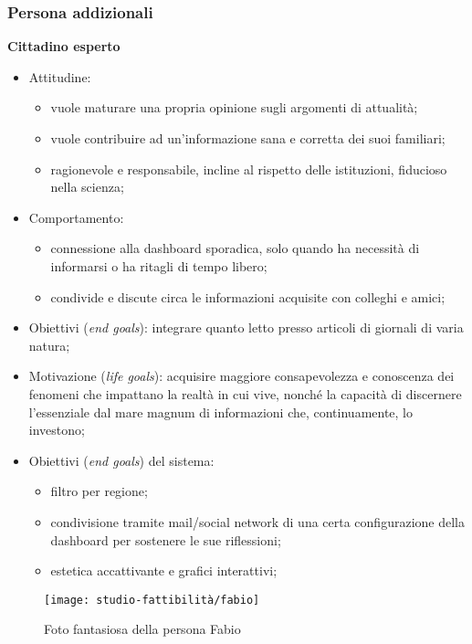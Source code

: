 \subsubsection*{Persona addizionali}
\textbf{Cittadino esperto}
	\begin{itemize}
	\item Attitudine:
    \begin{itemize}
        \item vuole maturare una propria opinione sugli argomenti di attualità;
        \item vuole contribuire ad un'informazione sana e corretta dei suoi familiari;
        \item ragionevole e responsabile, incline al rispetto delle istituzioni, fiducioso nella scienza;
    \end{itemize}
	\item Comportamento: 
    \begin{itemize}
        \item connessione alla dashboard sporadica, solo quando ha necessità di informarsi o ha ritagli di tempo libero;
        \item condivide e discute circa le informazioni acquisite con colleghi e amici;
    \end{itemize}
    \item Obiettivi (\textit{end goals}): integrare quanto letto presso articoli di giornali di varia natura;
    \item Motivazione (\textit{life goals}): acquisire maggiore consapevolezza e conoscenza dei fenomeni che impattano la realtà in cui vive, nonché la capacità di discernere l'essenziale dal mare magnum di informazioni che, continuamente, lo investono;
    \item Obiettivi (\textit{end goals}) del sistema:
    \begin{itemize}
        \item filtro per regione;
        \item condivisione tramite mail/social network di una certa configurazione della dashboard per sostenere le sue riflessioni;
        \item estetica accattivante e grafici interattivi;
    \end{itemize}
\end{itemize}

\begin{wrapfigure}{r}{8cm}
    \texttt{[image: studio-fattibilità/fabio]}
    \caption{Foto fantasiosa della persona Fabio}
\end{wrapfigure}

